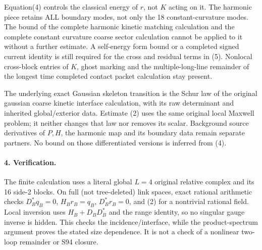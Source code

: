 \documentclass[11pt]{article}
\begin{document}
Equation(4) controls the classical energy of $r$, not $K$ acting on it.
The harmonic piece retains ALL boundary modes, not only the 18
constant-curvature modes. The bound of the complete harmonic kinetic matching calculation and the complete constant curvature coarse sector calculation cannot be applied to it
without a further estimate. A self-energy form bound or a completed
signed current identity is still required for the cross and residual
terms in (5). Nonlocal cross-block entries of $K$, ghost marking and
the multiple-long-line remainder of the longest time completed contact packet calculation stay present.

The underlying exact Gaussian skeleton transition is the Schur law of the original gaussian coarse kinetic interface calculation,
with its raw determinant and inherited global/exterior data. Estimate
(2) uses the same original local Maxwell problem; it neither changes
that law nor removes its scalar. Background source derivatives of
$P,H$, the harmonic map and its boundary data remain separate partners.
No bound on those differentiated versions is inferred from (4).

\paragraph{4. Verification.}
The finite calculation uses a literal global $L=4$ original relative complex and
its 16 side-2 blocks. On full (not tree-deleted) link spaces, exact
rational arithmetic checks $D_B^*q_B=0$, $H_Br_B=q_B$, $D_B^*r_B=0$,
and (2) for a nontrivial rational field. Local inversion uses
$H_B+D_BD_B^*$ and the range identity, so no singular gauge inverse is
hidden. This checks the incidence/interface, while the product-spectrum
argument proves the stated size dependence. It is not a check of a
nonlinear two-loop remainder or S94 closure.
\end{document}
